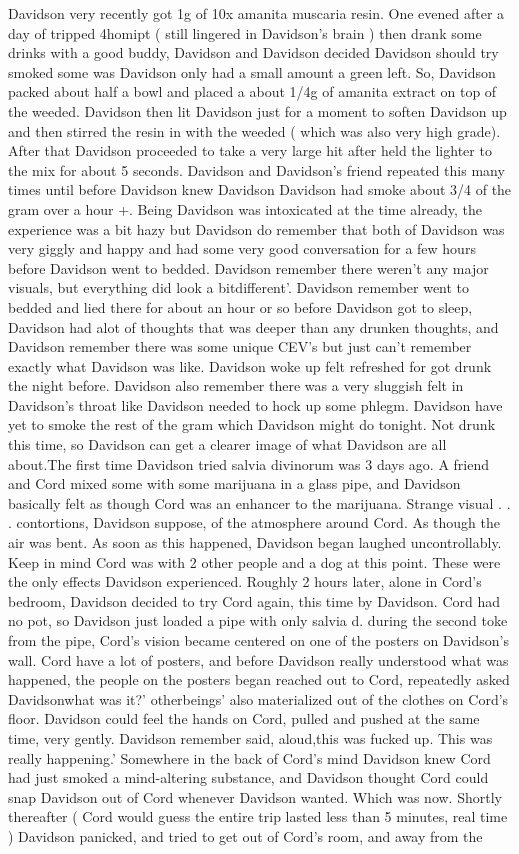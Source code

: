 \documentclass[12pt]{book}
\begin{document}
Davidson very recently got 1g of 10x amanita muscaria resin. One evened after a day of tripped 4homipt ( still lingered in Davidson's brain ) then drank some drinks with a good buddy, Davidson and Davidson decided Davidson should try smoked some was Davidson only had a small amount a green left. So, Davidson packed about half a bowl and placed a about 1/4g of amanita extract on top of the weeded. Davidson then lit Davidson just for a moment to soften Davidson up and then stirred the resin in with the weeded ( which was also very high grade). After that Davidson proceeded to take a very large hit after held the lighter to the mix for about 5 seconds. Davidson and Davidson's friend repeated this many times until before Davidson knew Davidson Davidson had smoke about 3/4 of the gram over a hour +. Being Davidson was intoxicated at the time already, the experience was a bit hazy but Davidson do remember that both of Davidson was very giggly and happy and had some very good conversation for a few hours before Davidson went to bedded. Davidson remember there weren't any major visuals, but everything did look a bitdifferent'. Davidson remember went to bedded and lied there for about an hour or so before Davidson got to sleep, Davidson had alot of thoughts that was deeper than any drunken thoughts, and Davidson remember there was some unique CEV's but just can't remember exactly what Davidson was like. Davidson woke up felt refreshed for got drunk the night before. Davidson also remember there was a very sluggish felt in Davidson's throat like Davidson needed to hock up some phlegm. Davidson have yet to smoke the rest of the gram which Davidson might do tonight. Not drunk this time, so Davidson can get a clearer image of what Davidson are all about.The first time Davidson tried salvia divinorum was 3 days ago. A friend and Cord mixed some with some marijuana in a glass pipe, and Davidson basically felt as though Cord was an enhancer to the marijuana. Strange visual . . .  contortions, Davidson suppose, of the atmosphere around Cord. As though the air was bent. As soon as this happened, Davidson began laughed uncontrollably. Keep in mind Cord was with 2 other people and a dog at this point. These were the only effects Davidson experienced. Roughly 2 hours later, alone in Cord's bedroom, Davidson decided to try Cord again, this time by Davidson. Cord had no pot, so Davidson just loaded a pipe with only salvia d. during the second toke from the pipe, Cord's vision became centered on one of the posters on Davidson's wall. Cord have a lot of posters, and before Davidson really understood what was happened, the people on the posters began reached out to Cord, repeatedly asked Davidsonwhat was it?' otherbeings' also materialized out of the clothes on Cord's floor. Davidson could feel the hands on Cord, pulled and pushed at the same time, very gently. Davidson remember said, aloud,this was fucked up. This was really happening.' Somewhere in the back of Cord's mind Davidson knew Cord had just smoked a mind-altering substance, and Davidson thought Cord could snap Davidson out of Cord whenever Davidson wanted. Which was now. Shortly thereafter ( Cord would guess the entire trip lasted less than 5 minutes, real time ) Davidson panicked, and tried to get out of Cord's room, and away from the 
\end{document}
